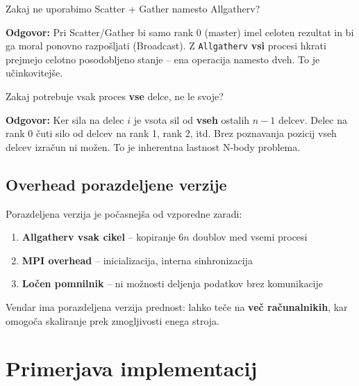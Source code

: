 \documentclass[12pt,a4paper]{article}
\begin{document}
\begin{vprasanje}
Zakaj ne uporabimo Scatter + Gather namesto Allgatherv?

\textbf{Odgovor:} Pri Scatter/Gather bi samo rank 0 (master) imel celoten rezultat in bi ga moral ponovno razpo\v{s}ljati (Broadcast). Z \texttt{Allgatherv} \textbf{vsi} procesi hkrati prejmejo celotno posodobljeno stanje -- ena operacija namesto dveh. To je u\v{c}inkovitej\v{s}e.
\end{vprasanje}

\begin{vprasanje}
Zakaj potrebuje vsak proces \textbf{vse} delce, ne le svoje?

\textbf{Odgovor:} Ker sila na delec $i$ je vsota sil od \textbf{vseh} ostalih $n-1$ delcev. Delec na rank 0 \v{c}uti silo od delcev na rank 1, rank 2, itd. Brez poznavanja pozicij vseh delcev izra\v{c}un ni mo\v{z}en. To je inherentna lastnost N-body problema.
\end{vprasanje}

\subsection{Overhead porazdeljene verzije}

Porazdeljena verzija je po\v{c}asnej\v{s}a od vzporedne zaradi:
\begin{enumerate}
    \item \textbf{Allgatherv vsak cikel} -- kopiranje $6n$ doublov med vsemi procesi
    \item \textbf{MPI overhead} -- inicializacija, interna sinhronizacija
    \item \textbf{Lo\v{c}en pomnilnik} -- ni mo\v{z}nosti deljenja podatkov brez komunikacije
\end{enumerate}

Vendar ima porazdeljena verzija prednost: lahko te\v{c}e na \textbf{ve\v{c} ra\v{c}unalnikih}, kar omogo\v{c}a skaliranje prek zmogljivosti enega stroja.

\section{Primerjava implementacij}
\end{document}

